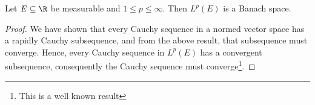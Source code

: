 \begin{theorem}
    Let $E\subseteq\R$ be measurable and $1\le p\le\infty$. Then $L^p(E)$ is a Banach space.
\end{theorem}
\begin{proof}
    We have shown that every Cauchy sequence in a normed vector space has a rapidly Cauchy subsequence, and from the above result, that subsequence must converge. Hence, every Cauchy sequence in $L^p(E)$ has a convergent subsequence, consequently the Cauchy sequence must converge\footnote{This is a well known result}.
\end{proof}